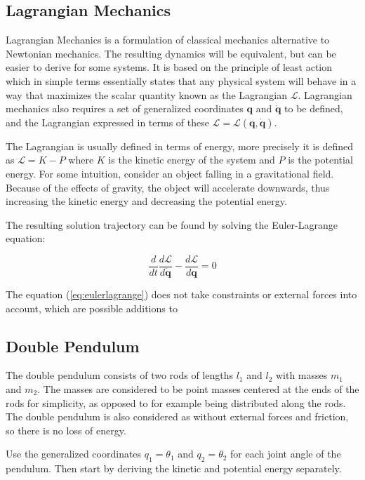 \subsection{Lagrangian Mechanics}

Lagrangian Mechanics is a formulation of classical mechanics alternative to Newtonian mechanics. The resulting dynamics will be equivalent, but can be easier to derive for some systems. It is based on the principle of least action which in simple terms essentially states that any physical system will behave in a way that maximizes the scalar quantity known as the Lagrangian $\mathcal{L}$. Lagrangian mechanics also requires a set of generalized coordinates $\bm{q}$ and $\dot{\bm{q}}$ to be defined, and the Lagrangian expressed in terms of these $\mathcal{L} = \mathcal{L}(\bm{q}, \dot{\bm{q}})$.

The Lagrangian is usually defined in terms of energy, more precisely it is defined as $\mathcal{L} = K - P$ where $K$ is the kinetic energy of the system and $P$ is the potential energy. For some intuition, consider an object falling in a gravitational field. Because of the effects of gravity, the object will accelerate downwards, thus increasing the kinetic energy and decreasing the potential energy.

The resulting solution trajectory can be found by solving the Euler-Lagrange equation:

\begin{equation}
    \frac{d}{d t} \frac{d \mathcal{L}}{d \dot{\bm{q}}} - \frac{d \mathcal{L}}{d \bm{q}} = 0
    \label{eq:eulerlagrange}
\end{equation}

The equation (\ref{eq:eulerlagrange}) does not take constraints or external forces into account, which are possible additions to 

\subsection{Double Pendulum}


The double pendulum consists of two rods of lengths $l_1$ and $l_2$ with masses $m_1$ and $m_2$. The masses are considered to be point masses centered at the ends of the rods for simplicity, as opposed to for example being distributed along the rods. The double pendulum is also considered as without external forces and friction, so there is no loss of energy.

Use the generalized coordinates $q_1 = \theta_1$ and $q_2 = \theta_2$ for each joint angle of the pendulum. Then start by deriving the kinetic and potential energy separately.

